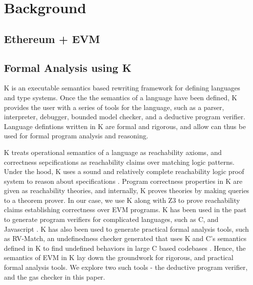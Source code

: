 \section{Background}
\subsection{Ethereum + EVM}
\subsection{Formal Analysis using K}
K is an executable semantics based rewriting framework for defining languages and type systems. Once the the semantics of a language have been defined, K provides the user with a series of tools for the language, such as a parser, interpreter, debugger, bounded model checker, and a deductive program verifier. Language defintions written in K are formal and rigorous, and allow can thus be used for formal program analysis and reasoning.

K treats operational semantics of a language as reachability axioms, and
correctness sepcifications as reachability claims over matching logic patterns.
Under the hood, K uses a sound and relatively complete reachability logic proof
system to reason about specifications
\cite{stefanescu-park-yuwen-li-rosu-2016-oopsla}
\cite{stefanescu-ciobaca-mereuta-moore-serbanuta-rosu-2014-rta}. Program
correctness properties in K are given as reachability theories, and internally,
K proves theories by making queries to a theorem prover. In our case, we use K
along with Z3 \cite{de2008z3} to prove reachability claims establishing correctness over EVM programs. K has been used in the past to generate program verifiers for complicated languages, such as C, and Javascript \cite{stefanescu-park-yuwen-li-rosu-2016-oopsla}. K has also been used to generate practical formal analysis tools, such as RV-Match, an undefinedness checker generated that uses K and C's semantics defined in K to find undefined behaviors in large C based codebases \cite{guth-hathhorn-saxena-rosu-2016-cav}. Hence, the semantics of EVM in K lay down the groundwork for rigorous, and practical formal analysis tools. We explore two such tools - the deductive program verifier, and the gas checker in this paper.

